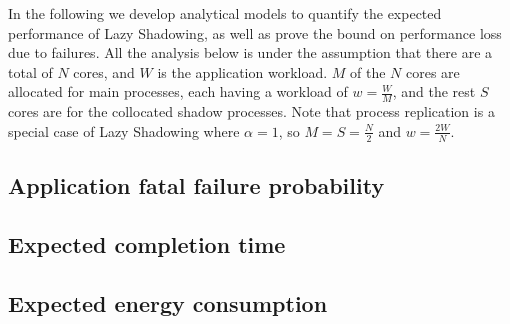 In the following we develop analytical models to quantify the expected performance of Lazy Shadowing, as well as prove the bound on performance loss due to failures. %
All the analysis below is under the assumption that there are a total of $N$ cores, and $W$ is the application workload.  
$M$ of the $N$ cores are allocated for main processes, each having a workload of $w=\frac{W}{M}$, and the rest $S$ cores are for the collocated shadow processes. %
Note that process replication is a special case of Lazy Shadowing where $\alpha=1$, so 
$M=S=\frac{N}{2}$ and $w=\frac{2W}{N}$. 


\subsection{Application fatal failure probability}
\label{anal_app_fail}


\subsection{Expected completion time}
\label{anal_time}


\subsection{Expected energy consumption}
\label{anal_energy}


